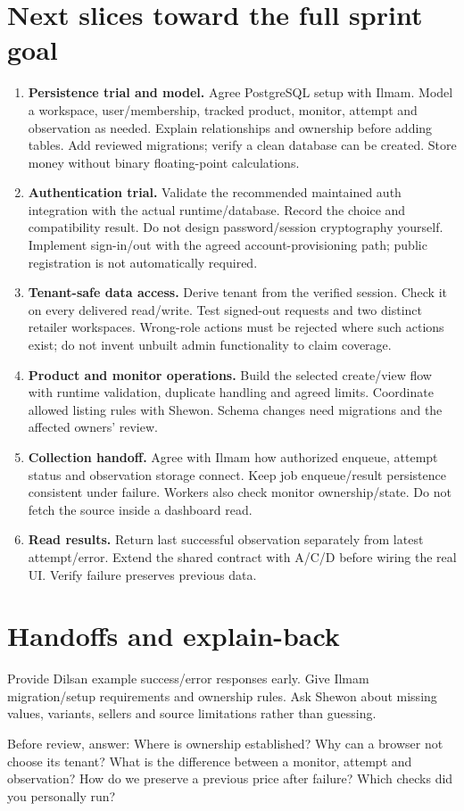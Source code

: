 \section*{Next slices toward the full sprint goal}
\begin{enumerate}
\item \textbf{Persistence trial and model.} Agree PostgreSQL setup with Ilmam. Model a workspace, user/membership, tracked product, monitor, attempt and observation as needed. Explain relationships and ownership before adding tables. Add reviewed migrations; verify a clean database can be created. Store money without binary floating-point calculations.
\item \textbf{Authentication trial.} Validate the recommended maintained auth integration with the actual runtime/database. Record the choice and compatibility result. Do not design password/session cryptography yourself. Implement sign-in/out with the agreed account-provisioning path; public registration is not automatically required.
\item \textbf{Tenant-safe data access.} Derive tenant from the verified session. Check it on every delivered read/write. Test signed-out requests and two distinct retailer workspaces. Wrong-role actions must be rejected where such actions exist; do not invent unbuilt admin functionality to claim coverage.
\item \textbf{Product and monitor operations.} Build the selected create/view flow with runtime validation, duplicate handling and agreed limits. Coordinate allowed listing rules with Shewon. Schema changes need migrations and the affected owners' review.
\item \textbf{Collection handoff.} Agree with Ilmam how authorized enqueue, attempt status and observation storage connect. Keep job enqueue/result persistence consistent under failure. Workers also check monitor ownership/state. Do not fetch the source inside a dashboard read.
\item \textbf{Read results.} Return last successful observation separately from latest attempt/error. Extend the shared contract with A/C/D before wiring the real UI. Verify failure preserves previous data.
\end{enumerate}
\section*{Handoffs and explain-back}
Provide Dilsan example success/error responses early. Give Ilmam migration/setup requirements and ownership rules. Ask Shewon about missing values, variants, sellers and source limitations rather than guessing.

Before review, answer: Where is ownership established? Why can a browser not choose its tenant? What is the difference between a monitor, attempt and observation? How do we preserve a previous price after failure? Which checks did you personally run?
\sharedfinish
